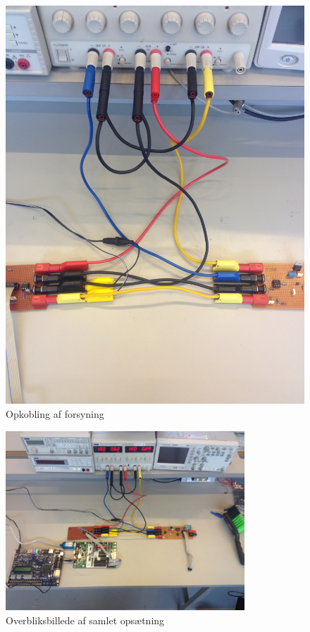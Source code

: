 \begin{figure}[H]
	\centering
	\includegraphics[width=\textwidth]{billeder/IntTest/forsyning}
	\caption{Opkobling af forsyning}
    \label{fig:opkobling_forsyning}
\end{figure}

\begin{figure}[H]
	\centering
	\includegraphics[width=0.8\textwidth]{billeder/IntTest/system}
	\caption{Overbliksbillede af samlet opsætning}
    \label{fig:system_sammensat}
\end{figure}


